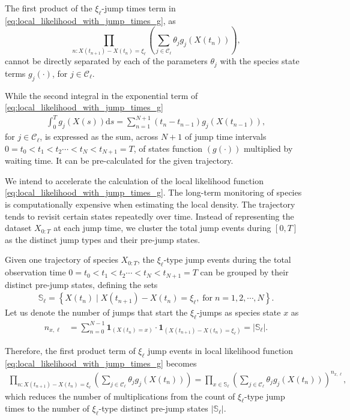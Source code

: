 \documentclass[pdflatex,sn-mathphys-num]{sn-jnl}%
\def\dd{\text{d}}
\theoremstyle{thmstyleone}%
\theoremstyle{thmstyletwo}%
\theoremstyle{thmstylethree}%
\begin{document}
The first product of the $\xi_{\ell}$-jump times term in \eqref{eq:local_likelihood_with_jump_times_g}, as 
\[\prod_{n: X(t_{n+1})-X(t_n) = \xi_\ell}
    \left( \sum_{j \in \mathcal C_\ell} \theta_{j} g_{j}\left( X(t_n)\right) \right), \]
cannot be directly separated by each of the parameters $\theta_{j}$ with the species state terms $g_{j}(\cdot)$, for $j\in \mathcal{C}_\ell$.

    
While the second integral in the exponential term of  \eqref{eq:local_likelihood_with_jump_times_g} 
\begin{align}
    \int_0^T g_{j}(X(s))\dd s = \sum_{n=1}^{N+1} (t_n-t_{n-1})  g_{j}(X(t_{n-1})) ,
\end{align}
for $j\in \mathcal{C}_\ell$, is expressed as the sum, across $N+1$ of jump time intervals $ 0=t_0 < t_1<t_2\cdots< t_N< t_{N+1}=T$, of states function $(g(\cdot))$ multiplied by waiting time. It
can be pre-calculated for the given trajectory. 

 We intend to accelerate the calculation of the local likelihood function \eqref{eq:local_likelihood_with_jump_times_g}.
The long-term monitoring of species is computationally expensive when estimating the local density. The trajectory tends to revisit certain states repeatedly over time. Instead of representing the dataset $X_{0:T}$ at each jump time, we cluster the total jump events during $[0,T]$ as the distinct jump types and their pre-jump states.


Given one trajectory of species $X_{0:T}$, the $\xi_{\ell}$-type jump events during the total observation time $0=t_0 < t_1<t_2\cdots< t_N< t_{N+1}=T$ can be grouped by their distinct pre-jump states, defining the sets
\begin{align}
    \mathbb{S}_{\ell} = \left\{ X(t_n) \mid X(t_{n+1})-X(t_{n})=\xi_{\ell}, \; \text{for}\; n=1,2,\cdots, N \right\}. 
\end{align}
 Let us denote the number of jumps that start the $\xi_{\ell}$-jumps as species state $x$ as 
\begin{align}
     n_{x,\ell} &= \sum_{n=0}^{N-1} \mathbf{1}_{(X(t_n) = x)} \cdot \mathbf{1}_{(X(t_{n+1}) - X(t_n) = \xi_\ell)}=\left|\mathbb{S}_{\ell}\right|.
\end{align}

Therefore, the first product term of $\xi_{\ell}$ jump events in local likelihood function \eqref{eq:local_likelihood_with_jump_times_g} becomes 
\begin{align*}
   \prod_{n: X(t_{n+1})-X(t_n) = \xi_\ell}
    \left( \sum_{j \in \mathcal C_\ell} \theta_{j} g_{j}\left( X(t_n)\right) \right) =   \prod_{x \in \mathbb{S}_{\ell} } \left( \sum_{j \in \mathcal C_\ell} \theta_{j} g_{j}\left( X(t_n)\right) \right)^{n_{x,\ell}} ,
 \end{align*}
which reduces the number of multiplications from the count of $\xi_{\ell}$-type jump times to the number of $\xi_{\ell}$-type distinct pre-jump states $\left|\mathbb{S}_{\ell}\right|$.   
\end{document}
